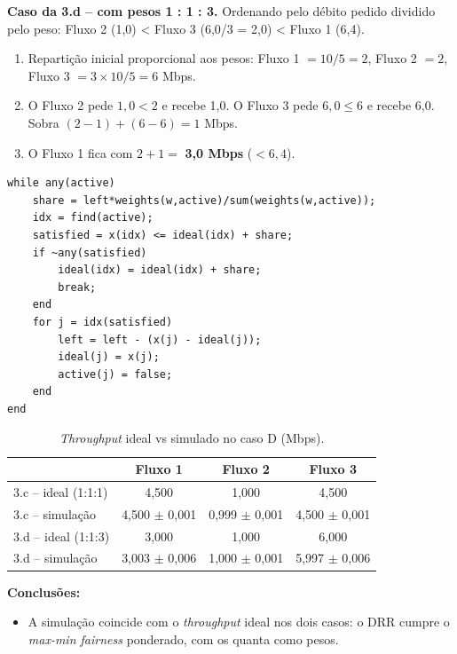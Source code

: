 \documentclass[11pt,a4paper]{article}
\begin{document}
\textbf{Caso da 3.d -- com pesos 1 : 1 : 3.} Ordenando pelo débito pedido dividido pelo peso: Fluxo 2 (1,0) < Fluxo 3 (6,0/3 = 2,0) < Fluxo 1 (6,4).
\begin{enumerate}
  \item Repartição inicial proporcional aos pesos: Fluxo 1 $= 10/5 = 2$, Fluxo 2 $= 2$, Fluxo 3 $= 3 \times 10/5 = 6$ Mbps.
  \item O Fluxo 2 pede $1{,}0 < 2$ e recebe 1,0. O Fluxo 3 pede $6{,}0 \le 6$ e recebe 6,0. Sobra $(2-1) + (6-6) = 1$ Mbps.
  \item O Fluxo 1 fica com $2 + 1 = $ \textbf{3,0 Mbps} ($< 6{,}4$).
\end{enumerate}


\begin{lstlisting}
while any(active)
    share = left*weights(w,active)/sum(weights(w,active));
    idx = find(active);
    satisfied = x(idx) <= ideal(idx) + share;
    if ~any(satisfied)
        ideal(idx) = ideal(idx) + share;
        break;
    end
    for j = idx(satisfied)
        left = left - (x(j) - ideal(j));
        ideal(j) = x(j);
        active(j) = false;
    end
end
\end{lstlisting}

\begin{table}[H]
\centering
\caption{\textit{Throughput} ideal vs simulado no caso D (Mbps).}
\begin{tabular}{lccc}
\toprule
 & Fluxo 1 & Fluxo 2 & Fluxo 3 \\
\midrule
3.c -- ideal (1:1:1) & 4,500 & 1,000 & 4,500 \\
3.c -- simulação     & 4,500 $\pm$ 0,001 & 0,999 $\pm$ 0,001 & 4,500 $\pm$ 0,001 \\
\midrule
3.d -- ideal (1:1:3) & 3,000 & 1,000 & 6,000 \\
3.d -- simulação     & 3,003 $\pm$ 0,006 & 1,000 $\pm$ 0,001 & 5,997 $\pm$ 0,006 \\
\bottomrule
\end{tabular}
\end{table}

\textbf{Conclusões:}
\begin{itemize}
  \item A simulação coincide com o \textit{throughput} ideal nos dois casos: o DRR cumpre o \textit{max-min fairness} ponderado, com os quanta como pesos.
\end{itemize}

\end{document}
